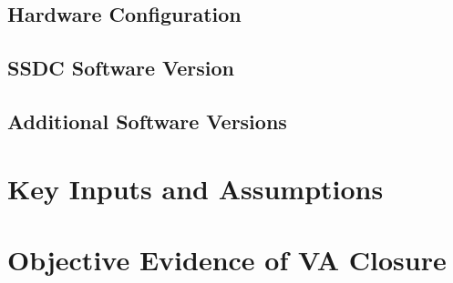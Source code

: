 \documentclass[TR]{spherex}
\begin{document}
\subsection{Hardware Configuration}

\subsection{SSDC Software Version}

\subsection{Additional Software Versions} %

\section{Key Inputs and Assumptions} %


\section{Objective Evidence of VA Closure}

\end{document}
